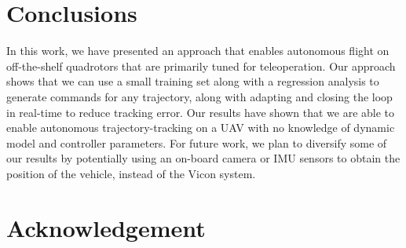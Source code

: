 \documentclass[letterpaper, 10 pt, conference]{ieeeconf}  %
\begin{document}
\section{Conclusions} \label{sec:conc}
In this work, we have presented an approach that enables autonomous flight on off-the-shelf quadrotors that are primarily tuned for teleoperation. Our approach shows that we can use a small training set along with a regression analysis to generate commands for any trajectory, along with adapting and closing the loop in real-time to reduce tracking error. Our results have shown that we are able to enable autonomous trajectory-tracking on a UAV with no knowledge of dynamic model and controller parameters. For future work, we plan to diversify some of our results by potentially using an on-board camera or IMU sensors to obtain the position of the vehicle, instead of the Vicon system. 



\section{Acknowledgement}


\addtolength{\textheight}{-12cm}   %








\end{document}
